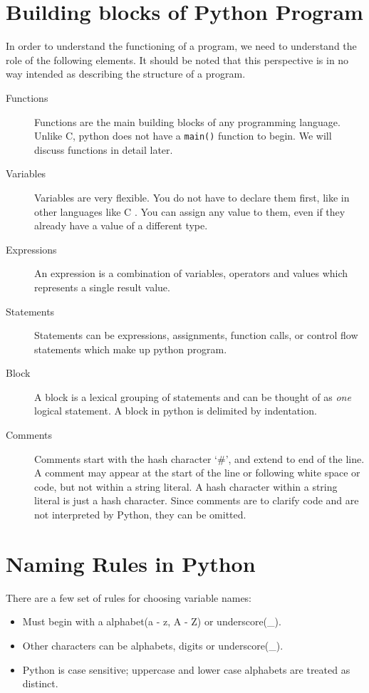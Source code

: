 \documentclass[11pt,a4paper]{article}
\begin{document}
\section*{Building blocks of Python Program}
In order to understand the functioning of a program, we need to understand the role of the following elements. It should be noted that this perspective is in no way intended as describing the structure of a program. 
\begin{description}
\item [Functions] Functions are the main building blocks of any programming language. Unlike C, python does not have a \texttt{main()} function to begin. We will discuss functions in detail later.
\item [Variables] Variables are very flexible. You do not have to declare them first, like in other languages like C . You can assign any value to them, even if they already have a value of a different type.
\item [Expressions] An expression is a combination of variables, operators and values which represents a single result value.
\item [Statements] Statements can be expressions, assignments, function calls, or control flow statements which make up python program.
\item [Block] A block is a lexical grouping of statements and can be thought of as \emph{one} logical statement. A block in python is delimited by indentation.
\item [Comments] Comments start with  the hash character `\#', and extend to end of the line. A comment may appear at the start of the line or following white space  or code, but  not within a string literal. A hash character within a string literal is just a hash character. Since comments are to clarify code and are not interpreted by Python, they can be omitted.
\end{description}


\section*{Naming Rules in Python}
There are a few set of rules for choosing variable names:
\begin{itemize}
\item Must begin with a alphabet(a - z, A - Z) or underscore(\_).
\item Other characters can be alphabets, digits or underscore(\_).
\item Python is case sensitive; uppercase and lower case alphabets are treated as distinct.
\end{itemize}
\end{document}
